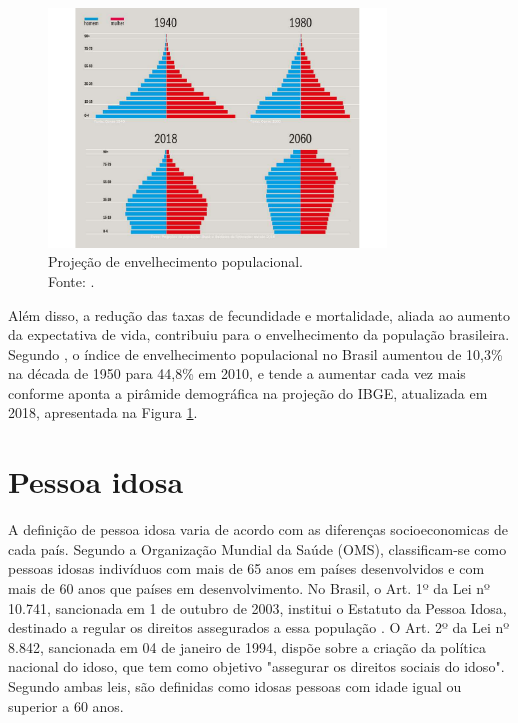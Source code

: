 \begin{figure}[H]
    \centering
    \includegraphics[width=0.8\textwidth]{figuras/envelhecimento_projecao.pdf}
    \caption{Projeção de envelhecimento populacional. \\
    Fonte: \cite{noauthor_ibge_nodate}.}
    \label{fig:envelhecimento}
\end{figure}

Além disso, a redução das taxas de fecundidade e mortalidade, aliada ao aumento da expectativa de vida, contribuiu para o envelhecimento da população brasileira. Segundo , o índice de envelhecimento populacional no Brasil aumentou de 10,3\% na década de 1950 para 44,8\% em 2010, e tende a aumentar cada vez mais conforme aponta a pirâmide demográfica na projeção do IBGE, atualizada em 2018, apresentada na Figura \ref{fig:envelhecimento}.

\section{Pessoa idosa}
A definição de pessoa idosa varia de acordo com as diferenças socioeconomicas de cada país. Segundo a Organização Mundial da Saúde (OMS), classificam-se como pessoas idosas indivíduos com mais de 65 anos em países desenvolvidos e com mais de 60 anos que países em desenvolvimento.
No Brasil, o Art. 1º da Lei nº 10.741, sancionada em 1 de outubro de 2003, institui o Estatuto da Pessoa Idosa, destinado a regular os direitos assegurados a essa população \cite{lei10741}. O Art. 2º da Lei nº 8.842, sancionada em 04 de janeiro de 1994, dispõe sobre a criação da política nacional do idoso, que tem como objetivo "assegurar os direitos sociais do idoso"\cite{lei8842}. Segundo ambas leis, são definidas como idosas pessoas com idade igual ou superior a 60 anos. 

